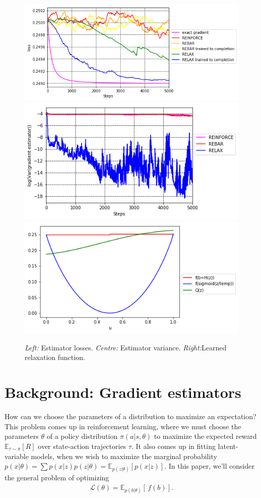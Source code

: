 \documentclass{article}
\newcommand{\discreteDist}{p(b|\theta)}
\newcommand{\loss}{f(b)}
\newcommand{\expectedLoss}{\mathbb{E}_{\discreteDist{}} \! \left[ \, \loss{} \right]}
\begin{document}
\begin{figure}[h]
\begin{center}
\includegraphics[width=.3\textwidth]{figures/losses}
\includegraphics[width=.3\textwidth]{figures/variance_no_opt}
\includegraphics[width=.3\textwidth]{figures/learned_r}
\label{first figure}
\end{center}
\caption{
\emph{Left:} Estimator losses.
\emph{Centre:} Estimator variance.
\emph{Right:}Learned relaxation function.
}
\end{figure}





\section{Background: Gradient estimators}

How can we choose the parameters of a distribution to maximize an expectation?
This problem comes up in reinforcement learning, where we must choose the parameters $\theta$ of a policy distribution $\pi(a|s, \theta)$ to maximize the expected reward $\mathbb{E}_{\tau \sim \pi} \left[ R \right]$ over state-action trajectories $\tau$.
It also comes up in fitting latent-variable models, when we wish to maximize the marginal probability ${p(x|\theta) = \sum p(x|z) p(z|\theta) = \mathbb{E}_{p(z|\theta)} \left[ p(x|z) \right]}$.
In this paper, we'll consider the general problem of optimizing
%
\begin{align}
\mathcal{L}(\theta)=\expectedLoss{}.
\end{align}
%
\end{document}

